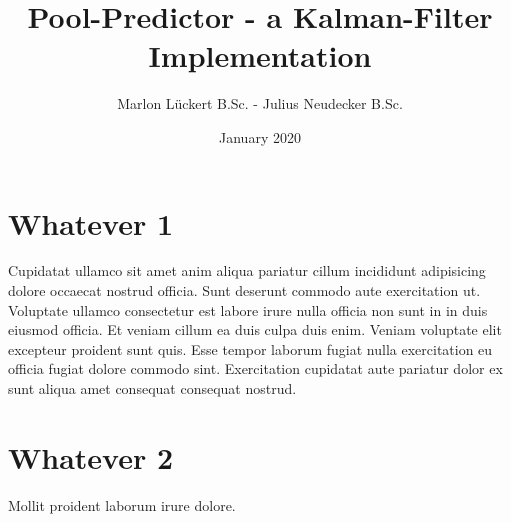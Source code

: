 \documentclass[titlepage, a4paper, 11pt]{scrartcl}
\begin{document}
\title{Pool-Predictor - a Kalman-Filter Implementation}
\author{Marlon Lückert B.Sc. - Julius Neudecker B.Sc.}
\date{January 2020}

\maketitle

\tableofcontents

\pagebreak

\section{Whatever 1}

Cupidatat ullamco sit amet anim aliqua pariatur cillum incididunt adipisicing dolore occaecat nostrud officia. Sunt deserunt commodo aute exercitation ut. Voluptate ullamco consectetur est labore irure nulla officia non sunt in in duis eiusmod officia. Et veniam cillum ea duis culpa duis enim. Veniam voluptate elit excepteur proident sunt quis. Esse tempor laborum fugiat nulla exercitation eu officia fugiat dolore commodo sint. Exercitation cupidatat aute pariatur dolor ex sunt aliqua amet consequat consequat nostrud.

\section{Whatever 2}

Mollit proident laborum irure dolore.
\end{document}
